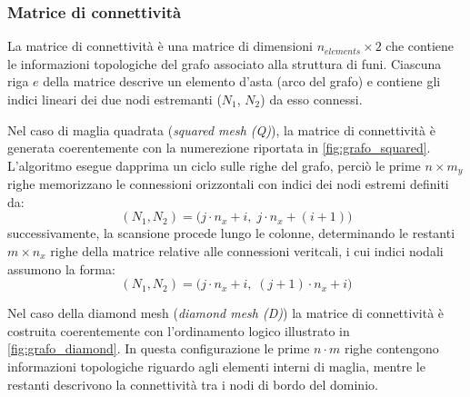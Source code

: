 \vspace{1em}
\subsubsection{Matrice di connettività}
La matrice di connettività è una matrice di dimensioni $n_{elements} \times 2$ che contiene le informazioni topologiche del grafo associato alla struttura di funi. Ciascuna riga $e$ della matrice descrive un elemento d'asta (arco del grafo) e contiene gli indici lineari dei due nodi estremanti ($N_1$, $N_2$) da esso connessi. 

\vspace{1em}
Nel caso di maglia quadrata (\textit{squared mesh (Q)}), la matrice di connettività è generata coerentemente con la numerezione riportata in \cref{fig:grafo_squared}. L'algoritmo esegue dapprima un ciclo sulle righe del grafo, perciò le prime $n \times m_y$ righe memorizzano le connessioni orizzontali con indici dei nodi estremi definiti da:
\begin{equation}
   (N_1, N_2) = \bigl(j \cdot n_x + i, \; j \cdot n_x + (i + 1)\bigr)
\end{equation}
successivamente, la scansione procede lungo le colonne, determinando le restanti $m \times n_x$ righe della matrice relative alle connessioni veritcali, i cui indici nodali assumono la forma:
\begin{equation}
   (N_1, N_2) = \bigl(j \cdot n_x + i, \; (j+1) \cdot n_x + i\bigr)
\end{equation}

\vspace{1em}
Nel caso della diamond mesh (\textit{diamond mesh (D)}) la matrice di connettività è costruita coerentemente con l'ordinamento logico illustrato in \cref{fig:grafo_diamond}. In questa configurazione le prime $n \cdot m$  righe contengono informazioni topologiche riguardo agli elementi interni di maglia, mentre le restanti descrivono la connettività tra i nodi di bordo del dominio. 

